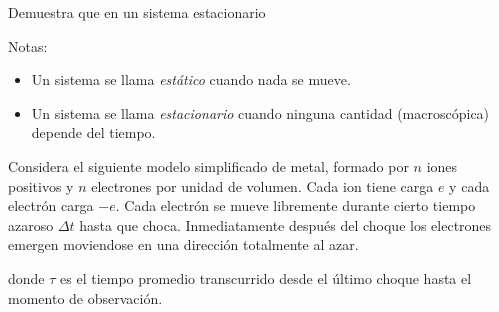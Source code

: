 \documentclass{exam}
\begin{document}
\begin{questions}
  \question Demuestra que en un sistema estacionario
    Notas:
    \begin{itemize}
    \item Un sistema se llama {\em estático} cuando nada se mueve.
    \item Un sistema se llama {\em estacionario} cuando ninguna
      cantidad (macroscópica) depende del tiempo.
    \end{itemize}

  \question Considera el siguiente modelo simplificado de metal,
    formado por $n$ iones positivos y $n$ electrones por unidad de
    volumen. Cada ion tiene carga $e$ y cada electrón carga $-e$. Cada
    electrón se mueve libremente durante cierto tiempo azaroso $\Delta
    t$ hasta que choca. Inmediatamente después del choque los
    electrones emergen moviendose en una dirección totalmente al
    azar.
    donde $\tau$ es el tiempo promedio transcurrido desde el último
    choque hasta el momento de observación.


\end{questions}
\end{document}
